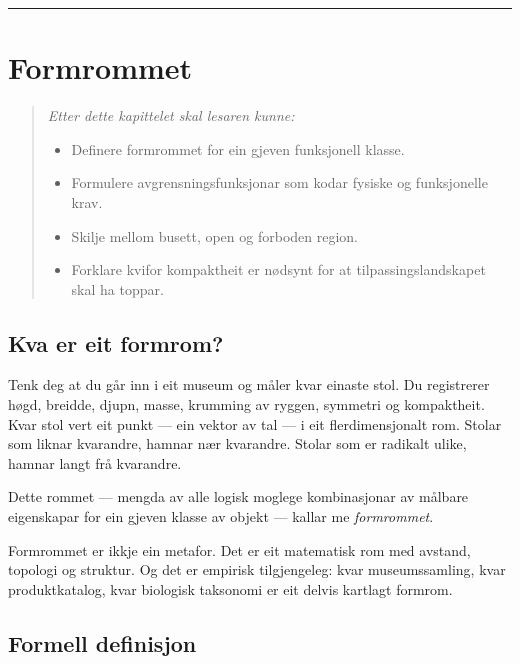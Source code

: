\documentclass[10pt]{book}
\theoremstyle{definition}
\theoremstyle{plain}
\theoremstyle{remark}
\begin{document}
\bigskip
\begin{center}
\rule{4cm}{0.4pt}
\end{center}


\chapter{Formrommet}\label{kap:formrom}

\begin{quote}\itshape
Etter dette kapittelet skal lesaren kunne:
\begin{itemize}[nosep]
\item Definere formrommet for ein gjeven funksjonell klasse.
\item Formulere avgrensningsfunksjonar som kodar fysiske og funksjonelle krav.
\item Skilje mellom busett, open og forboden region.
\item Forklare kvifor kompaktheit er n\o dsynt for at tilpassingslandskapet skal ha toppar.
\end{itemize}
\end{quote}

\section{Kva er eit formrom?}\label{sec:formrom:intuisjon}

Tenk deg at du g\aa r inn i eit museum og m\aa ler kvar einaste stol. Du registrerer h\o gd, breidde, djupn, masse, krumming av ryggen, symmetri og kompaktheit. Kvar stol vert eit punkt --- ein vektor av tal --- i eit flerdimensjonalt rom. Stolar som liknar kvarandre, hamnar n\ae r kvarandre. Stolar som er radikalt ulike, hamnar langt fr\aa{} kvarandre.

Dette rommet --- mengda av alle logisk moglege kombinasjonar av m\aa lbare eigenskapar for ein gjeven klasse av objekt --- kallar me \emph{formrommet}.

Formrommet er ikkje ein metafor. Det er eit matematisk rom med avstand, topologi og struktur. Og det er empirisk tilgjengeleg: kvar museumssamling, kvar produktkatalog, kvar biologisk taksonomi er eit delvis kartlagt formrom.

\section{Formell definisjon}\label{sec:formrom:def}
\end{document}
